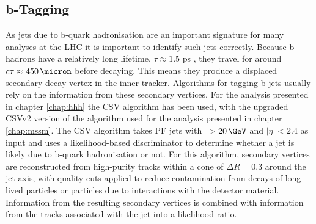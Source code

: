 \subsection{b-Tagging}
\label{sec:objects_jets_btag}
As jets due to b-quark hadronisation are an important signature
for many analyses at the \ac{LHC} it is important to identify such jets correctly.
Because b-hadrons have a relatively long lifetime, $\tau \approx 1.5$ ps \cite{pdg-2014},
they travel for around $c\tau \approx 450\,\micron$ before decaying. This means
they produce a displaced secondary decay vertex in the inner tracker.
Algorithms for tagging b-jets usually rely on the information
from these secondary vertices.
For the analysis presented in chapter \ref{chap:hhh}
the \ac{CSV} algorithm \cite{cms-btag-paper} has been used, with the upgraded
\ac{CSV}v2 version of the algorithm \cite{cms-btag-run2} used for the analysis presented in chapter \ref{chap:mssm}. 
The \ac{CSV} algorithm takes \ac{PF} jets with \pT~$> 20\,\GeV$ and $|\eta|<2.4$ as input and 
uses a likelihood-based discriminator to determine 
whether a jet is likely due to b-quark hadronisation or not.
For this algorithm, secondary vertices are reconstructed from high-purity tracks
within a cone of $\Delta R = 0.3$ around the jet axis, with quality cuts applied
to reduce contamination from decays of long-lived particles or particles due 
to interactions with the detector material. Information from the resulting
secondary vertices is combined with information from the tracks associated
with the jet into a likelihood ratio.

